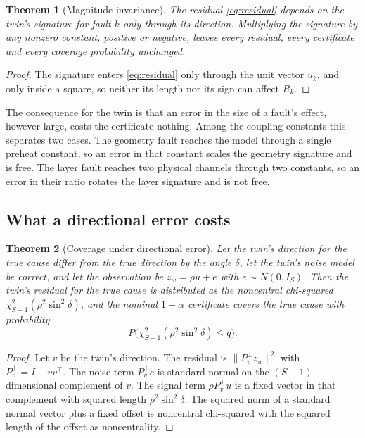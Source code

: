 \documentclass[preprint,12pt]{elsarticle}
\newtheorem{theorem}{Theorem}
\begin{document}
\begin{theorem}[Magnitude invariance]
\label{thm:magnitude}
The residual \eqref{eq:residual} depends on the twin's signature for fault $k$
only through its direction. Multiplying the signature by any nonzero constant,
positive or negative, leaves every residual, every certificate and every
coverage probability unchanged.
\end{theorem}

\begin{proof}
The signature enters \eqref{eq:residual} only through the unit vector $u_k$,
and only inside a square, so neither its length nor its sign can affect $R_k$.
\end{proof}

The consequence for the twin is that an error in the size of a fault's effect,
however large, costs the certificate nothing. Among the coupling constants this
separates two cases. The geometry fault reaches the model through a single
preheat constant, so an error in that constant scales the geometry signature and
is free. The layer fault reaches two physical channels through two constants, so
an error in their ratio rotates the layer signature and is not free.

\subsection{What a directional error costs}

\begin{theorem}[Coverage under directional error]
\label{thm:coverage}
Let the twin's direction for the true cause differ from the true direction by
the angle $\delta$, let the twin's noise model be correct, and let the
observation be $z_w = \rho u + e$ with $e \sim N(0, I_S)$. Then the twin's
residual for the true cause is distributed as the noncentral chi-squared
$\chi^2_{S-1}(\rho^2 \sin^2\delta)$, and the nominal $1-\alpha$ certificate
covers the true cause with probability
\begin{equation}
P\bigl(\chi^2_{S-1}(\rho^2\sin^2\delta) \le q\bigr).
\label{eq:coverage}
\end{equation}
\end{theorem}

\begin{proof}
Let $v$ be the twin's direction. The residual is $\|P_v^\perp z_w\|^2$ with
$P_v^\perp = I - vv^\top$. The noise term $P_v^\perp e$ is standard normal on the
$(S-1)$-dimensional complement of $v$. The signal term $\rho P_v^\perp u$ is a
fixed vector in that complement with squared length $\rho^2\sin^2\delta$. The
squared norm of a standard normal vector plus a fixed offset is noncentral
chi-squared with the squared length of the offset as noncentrality.
\end{proof}
\end{document}
